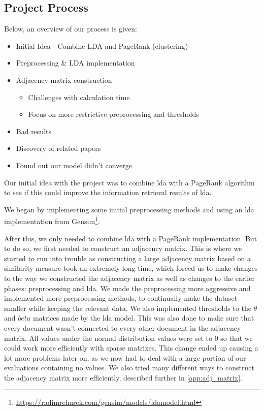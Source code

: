 \subsection{Project Process}
Below, an overview of our process is given:
\begin{itemize}
	\item Initial Idea - Combine LDA and PageRank (clustering)
	\item Preprocessing \& LDA implementation
	\item Adjacency matrix construction
	\begin{itemize}
		\item Challenges with calculation time
		\item Focus on more restrictive preprocessing and thresholds
	\end{itemize}
	\item Bad results
	\item Discovery of related papers
	\item Found out our model didn't converge
\end{itemize}

Our initial idea with the project was to combine \gls{lda} with a PageRank algorithm to see if this could improve the information retrieval results of \gls{lda}.

We began by implementing some initial preprocessing methods and using an \gls{lda} implementation from Gensim\footnote{\url{https://radimrehurek.com/gensim/models/ldamodel.html}}.

After this, we only needed to combine \gls{lda} with a PageRank implementation. 
But to do so, we first needed to construct an adjacency matrix. 
This is where we started to run into trouble as constructing a large adjacency matrix based on a similarity measure took an extremely long time, which forced us to make changes to the way we constructed the adjacency matrix as well as changes to the earlier phases: preprocessing and \gls{lda}.
We made the preprocessing more aggressive and implemented more preprocessing methods, to continually make the dataset smaller while keeping the relevant data.
We also implemented thresholds to the $\theta$ and $beta$ matrices made by the \gls{lda} model.
This was also done to make sure that every document wasn't connected to every other document in the adjacency matrix.
All values under the normal distribution values were set to 0 so that we could work more efficiently with sparse matrixes.
This change ended up causing a lot more problems later on, as we now had to deal with a large portion of our evaluations containing no values. 
We also tried many different ways to construct the adjacency matrix more efficiently, described further in \autoref{app:adj_matrix}.

